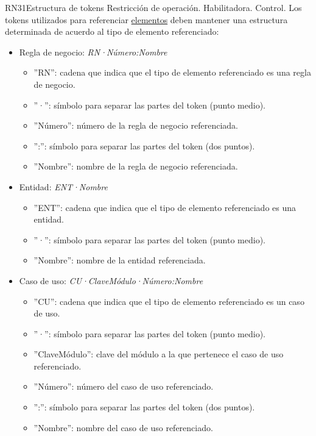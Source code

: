 \begin{BussinesRule}{RN31}{Estructura de tokens} 
	\BRitem[Tipo:] Restricción de operación. 
	\BRitem[Clase:] Habilitadora. 
	\BRitem[Nivel:] Control. %
	\BRitem[Descripción:] Los tokens utilizados para referenciar \hyperlink{tElemento}{elementos} deben mantener una estructura determinada de acuerdo al tipo de elemento referenciado:
	\begin{itemize}
		\item Regla de negocio: {\em RN·Número:Nombre}
		\begin{itemize}
			\item ''RN'': cadena que indica que el tipo de elemento referenciado es una regla de negocio.
			\item ''·'': símbolo para separar las partes del token (punto medio).
			\item ''Número'': número de la regla de negocio referenciada.
			\item '':'': símbolo para separar las partes del token (dos puntos).
			\item ''Nombre'': nombre de la regla de negocio referenciada.
		\end{itemize}
		\item Entidad: {\em ENT·Nombre}
		\begin{itemize}
			\item ''ENT'': cadena que indica que el tipo de elemento referenciado es una entidad.
			\item ''·'': símbolo para separar las partes del token (punto medio).
			\item ''Nombre'': nombre de la entidad referenciada.
		\end{itemize}
		\item Caso de uso: {\em CU·ClaveMódulo·Número:Nombre}
		\begin{itemize}
			\item ''CU'': cadena que indica que el tipo de elemento referenciado es un caso de uso.
			\item ''·'': símbolo para separar las partes del token (punto medio).
			\item ''ClaveMódulo'': clave del módulo a la que pertenece el caso de uso referenciado.
			\item ''Número'': número del caso de uso referenciado.
			\item '':'': símbolo para separar las partes del token (dos puntos).
			\item ''Nombre'': nombre del caso de uso referenciado.

\end{itemize}
\end{itemize}
\end{BussinesRule}

